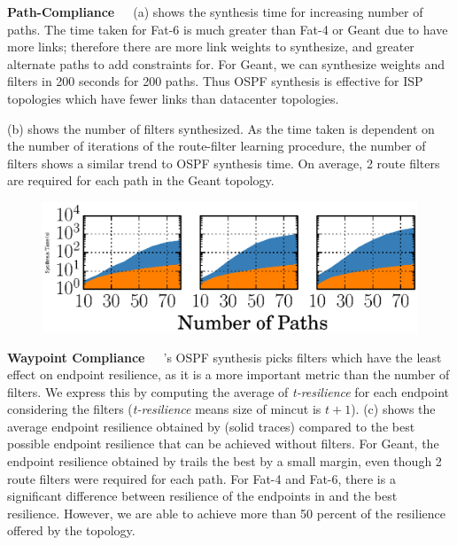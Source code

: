 \noindent\textbf{Path-Compliance}~~~(a) 
shows the synthesis time for increasing number of paths. 
The time taken for Fat-6 is much greater than Fat-4 or Geant
due to have more links; therefore there are more link weights
to synthesize, and greater alternate paths to add constraints for. 
For Geant, we can synthesize weights and filters in 200 seconds 
for 200 paths. Thus OSPF synthesis is effective for ISP topologies
which have fewer links than datacenter topologies.

(b) shows the number of filters synthesized. 
As the time taken is dependent on the number of iterations of
the route-filter learning procedure, the number of filters
shows a similar trend to OSPF synthesis time. On average, 2 route filters
are required for each path in the Geant topology. 

\begin{figure}
	\begin{center}
		\includegraphics[width=0.6\columnwidth]{figures/ospfwaypoint.eps}
	\end{center}
\end{figure}

\noindent\textbf{Waypoint Compliance}~~~\name's OSPF synthesis picks
filters which have the least effect on endpoint resilience, as it  
is a more important metric than the number of filters. We express this
by computing the average of \emph{t-resilience} for each endpoint considering
the filters (\emph{t-resilience} means size of mincut is $t+1$).
(c) shows the average
endpoint resilience obtained by \name (solid traces) 
compared to the best possible endpoint resilience that  can be achieved
without filters. For Geant, the endpoint 
resilience obtained by \name trails the best by a small margin,
even though 2 route filters were required for each path. For
Fat-4 and Fat-6, there is a significant difference between resilience
of the endpoints in \name and the best resilience. 
However, we are able to achieve more than
50 percent of the resilience offered by the topology. 

